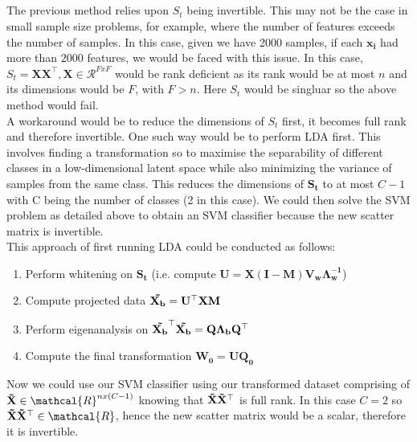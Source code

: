 \documentclass[12pt,twoside]{article}
\begin{document}
\newpage 

\subsection{}
The previous method relies upon $S_t$ being invertible. This may not be the case in small sample size problems, for example, where the number of features exceeds the number of samples. In this case, given we have 2000 samples, if each $\mathbf{x_i}$ had more than $2000$ features, we would be faced with this issue. In this case, $S_t = \mathbf{X X^\top, X} \in \mathcal{R} ^{F x F}$ would be rank deficient as its rank would be at most $n$ and its dimensions would be $F$, with $F > n$. Here $S_t$ would be singluar so the above method would fail. \\

A workaround would be to reduce the dimensions of $S_t$ first, it becomes full rank and therefore invertible. One such way would be to perform LDA first. This involves finding a transformation so to maximise the separability of different classes in a low-dimensional latent space while also minimizing the variance of samples from the same class. This reduces the dimensions of $\mathbf{S_t}$ to at most $C-1$ with C being the number of classes (2 in this case). We could then solve the SVM problem as detailed above to obtain an SVM classifier because the new scatter matrix is invertible. \\

This approach of first running LDA could be conducted as follows:

\begin{enumerate}
    \item Perform whitening on $\mathbf{S_t}$ (i.e. compute $\mathbf{U = X(I-M)V_w \Lambda_w^{-1}}$)
    \item Compute projected data $\mathbf{\Tilde{X_b} = U^\top XM}$
    \item Perform eigenanalysis on $\mathbf{\Tilde{X_b}^\top \Tilde{X_b} = Q\Lambda_bQ^\top}$
    \item Compute the final transformation $\mathbf{W_0 = UQ_0}$
\end{enumerate}

Now we could use our SVM classifier using our transformed dataset comprising of $\mathbf{\Tilde{X}} \in \mathcal{R}^{n x (C-1)}$ knowing that $\mathbf{\Tilde{X} \Tilde{X}^\top}$ is full rank. In this case $C = 2$ so $\mathbf{\Tilde{X} \Tilde{X}^\top} \in \mathcal{R}$, hence the new scatter matrix would be a scalar, therefore it is invertible. \\
\end{document}
